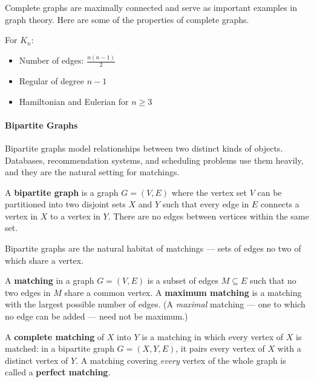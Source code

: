Complete graphs are maximally connected and serve as important examples in graph theory. Here are some of the properties of complete graphs.

\begin{theorem}
For $K_n$:
\begin{itemize}
    \item Number of edges: $\frac{n(n-1)}{2}$
    \item Regular of degree $n-1$
    \item Hamiltonian and Eulerian for $n \geq 3$
\end{itemize}
\end{theorem}

\paragraph{Bipartite Graphs}
Bipartite graphs model relationships between two distinct kinds of objects. Databases, recommendation systems, and scheduling problems use them heavily, and they are the natural setting for matchings.

\begin{definition}
A \textbf{bipartite graph} is a graph $G = (V, E)$ where the vertex set $V$ can be partitioned into two disjoint sets $X$ and $Y$ such that every edge in $E$ connects a vertex in $X$ to a vertex in $Y$. There are no edges between vertices within the same set.
\end{definition}

Bipartite graphs are the natural habitat of matchings — sets of edges no two of which share a vertex.

\begin{definition}
A \textbf{matching} in a graph $G = (V, E)$ is a subset of edges $M \subseteq E$ such that no two edges in $M$ share a common vertex. A \textbf{maximum matching} is a matching with the largest possible number of edges. (A \emph{maximal} matching --- one to which no edge can be added --- need not be maximum.)
\end{definition}

\begin{definition}
A \textbf{complete matching} of $X$ into $Y$ is a matching in which every vertex of $X$ is matched: in a bipartite graph $G = (X, Y, E)$, it pairs every vertex of $X$ with a distinct vertex of $Y$. A matching covering \emph{every} vertex of the whole graph is called a \textbf{perfect matching}.
\end{definition}

